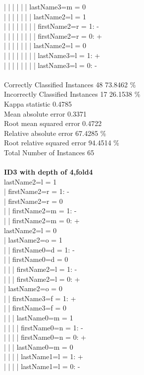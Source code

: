 \begin{enumerate}
|  |  |  |  |  |  lastName3=m = 0\\
|  |  |  |  |  |  |  lastName2=l = 1\\
|  |  |  |  |  |  |  |  firstName2=r = 1: -\\
|  |  |  |  |  |  |  |  firstName2=r = 0: +\\
|  |  |  |  |  |  |  lastName2=l = 0\\
|  |  |  |  |  |  |  |  lastName3=l = 1: +\\
|  |  |  |  |  |  |  |  lastName3=l = 0: -\\\\
Correctly Classified Instances          48     \hspace*{20 mm}          73.8462 \%\\
Incorrectly Classified Instances        17     \hspace*{20 mm}          26.1538 \%\\
Kappa statistic                         0.4785\\
Mean absolute error                     0.3371\\
Root mean squared error                 0.4722\\
Relative absolute error                 67.4285 \%\\
Root relative squared error             94.4514 \%\\
Total Number of Instances               65\\\\
\textbf{ID3 with depth of 4,fold4}\\
lastName2=l = 1\\
|  firstName2=r = 1: -\\
|  firstName2=r = 0\\
|  |  firstName2=m = 1: -\\
|  |  firstName2=m = 0: +\\
lastName2=l = 0\\
|  lastName2=o = 1\\
|  |  firstName0=d = 1: -\\
|  |  firstName0=d = 0\\
|  |  |  firstName2=l = 1: -\\
|  |  |  firstName2=l = 0: +\\
|  lastName2=o = 0\\
|  |  firstName3=f = 1: +\\
|  |  firstName3=f = 0\\
|  |  |  lastName0=m = 1\\
|  |  |  |  firstName0=n = 1: -\\
|  |  |  |  firstName0=n = 0: +\\
|  |  |  lastName0=m = 0\\
|  |  |  |  lastName1=l = 1: +\\
|  |  |  |  lastName1=l = 0: -\\


\end{enumerate}
